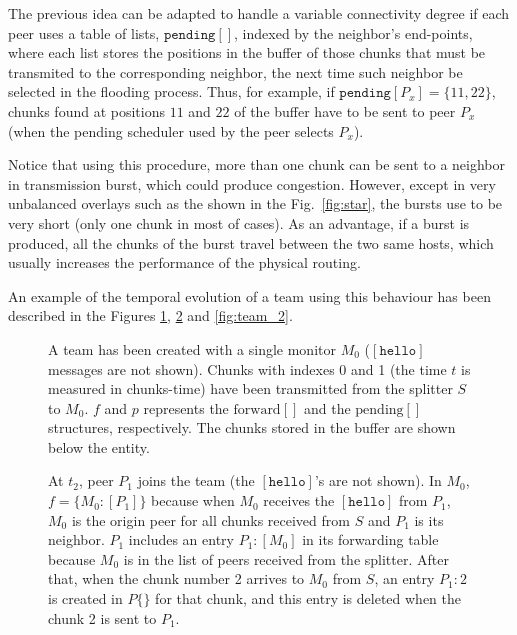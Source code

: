 The previous idea can be adapted to handle a variable connectivity
degree if each peer uses a table of lists, $\mathtt{pending}[]$,
indexed by the neighbor's end-points, where each list stores the
positions in the buffer of those chunks that must be transmited to the
corresponding neighbor, the next time such neighbor be selected in the
flooding process. Thus, for example, if
$\mathtt{pending}[P_x]=\{11,22\}$, chunks found at positions $11$ and
$22$ of the buffer have to be sent to peer $P_x$ (when the pending
scheduler used by the peer selects $P_x$).

Notice that using this procedure, more than one chunk can be sent to a
neighbor in transmission burst, which could produce
congestion. However, except in very unbalanced overlays such as the
shown in the Fig.~\ref{fig:star}, the bursts use to be very short
(only one chunk in most of cases). As an advantage, if a burst is
produced, all the chunks of the burst travel between the two same
hosts, which usually increases the performance of the physical
routing.

An example of the temporal evolution of a team using this behaviour
has been described in the Figures \ref{fig:team_0}, \ref{fig:team_1}
and \ref{fig:team_2}.

\begin{figure}
   \caption{A team has been created with a
    single monitor $M_0$ ($[\mathtt{hello}]$ messages are not
    shown). Chunks with indexes 0 and 1 (the time $t$ is measured in
    chunks-time) have been transmitted from the splitter $S$ to
    $M_0$. $f$ and $p$ represents the $\text{forward}[]$ and the
    $\text{pending}[]$ structures, respectively. The chunks stored in
    the buffer are shown below the entity.\label{fig:team_0}}
\end{figure}

\begin{figure}
   \caption{At $t_2$, peer $P_1$ joins
    the team (the $[\mathtt{hello}]$'s are not shown). In $M_0$,
    $f=\{M_0:[P_1]\}$ because when $M_0$ receives the
    $[\mathtt{hello}]$ from $P_1$, $M_0$ is the origin peer for all
    chunks received from $S$ and $P_1$ is its neighbor. $P_1$ includes
    an entry $P_1:[M_0]$ in its forwarding table because $M_0$ is in
    the list of peers received from the splitter. After that, when the
    chunk number 2 arrives to $M_0$ from $S$, an entry $P_1:2$ is
    created in $P\{\}$ for that chunk, and this entry is deleted when
    the chunk 2 is sent to $P_1$.\label{fig:team_1}}
\end{figure}

